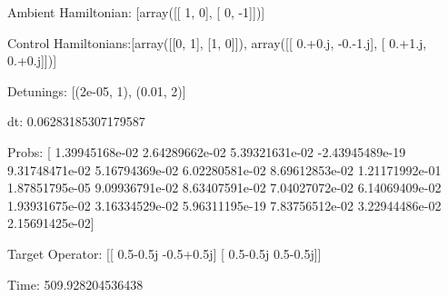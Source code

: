 \documentclass{article}
\begin{document}
    

\newpage

Ambient Hamiltonian: [array([[ 1,  0],
       [ 0, -1]])]

Control Hamiltonians:[array([[0, 1],
       [1, 0]]), array([[ 0.+0.j, -0.-1.j],
       [ 0.+1.j,  0.+0.j]])]

Detunings: [(2e-05, 1), (0.01, 2)]

 dt: 0.06283185307179587

Probs: [  1.39945168e-02   2.64289662e-02   5.39321631e-02  -2.43945489e-19
   9.31748471e-02   5.16794369e-02   6.02280581e-02   8.69612853e-02
   1.21171992e-01   1.87851795e-05   9.09936791e-02   8.63407591e-02
   7.04027072e-02   6.14069409e-02   1.93931675e-02   3.16334529e-02
   5.96311195e-19   7.83756512e-02   3.22944486e-02   2.15691425e-02]

Target Operator: [[ 0.5-0.5j -0.5+0.5j]
 [ 0.5-0.5j  0.5-0.5j]]

Time: 509.928204536438
\end{document}
